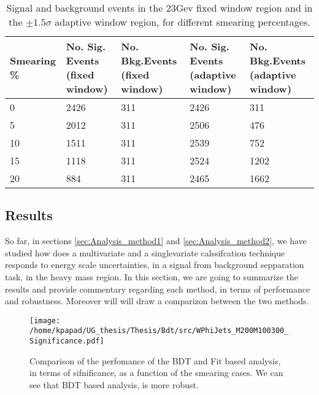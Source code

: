 \begin{table}[h!]
\centering
\begin{tabular}{|p{2cm}|p{3cm}|p{3cm}|p{3cm}|p{3cm}|}
 \hline
Smearing \%  & No. Sig. Events (fixed window) & No. Bkg.Events (fixed window) & No. Sig. Events (adaptive window) & No. Bkg.Events (adaptive window)  \\
\hline
0 & 2426 & 311 & 2426 & 311 \\
5 & 2012 & 311 & 2506 & 476 \\
10 & 1511 & 311 & 2539 & 752 \\
15 & 1118 & 311 & 2524 & 1202 \\
20 & 884 & 311 & 2465 & 1662 \\
 \hline
\end{tabular}
\caption{Signal and background events in the 23Gev fixed window region and in the $\pm 1.5\sigma$ adaptive window region, for different smearing percentages.}
\label{table:NumSigBkg}
\end{table}

\subsection{Results}
\label{sec:orgce822e9}
So far, in sections \ref{sec:Analysis_method1} and \ref{sec:Analysis_method2}, we have studied how does a multivariate and a singlevariate calssifcation technique responds to energy scale uncertainties, in a signal from background sepparation task, in the heavy mass region. In this section, we are going to summarize the results and provide commentary regarding each method, in terms of performance and robustness. Moreover will will draw a comparizon between the two methods.

\begin{figure}[h!]
\centering
\texttt{[image: /home/kpapad/UG\_thesis/Thesis/Bdt/src/WPhiJets\_M200M100300\_Significance.pdf]}
\caption{ Comparison of the perfomance of the BDT and Fit based analysis, in terms of sifnificance,  as a function of the smearing cases. We can see that BDT based analysis, is more robust.}
\label{fig:BdtFitSig}
\end{figure}

